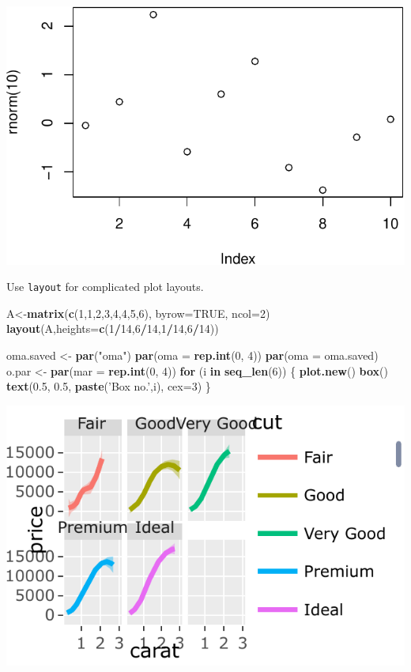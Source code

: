 \documentclass[]{book}
\newenvironment{Shaded}{\begin{snugshade}}{\end{snugshade}}
\newcommand{\KeywordTok}[1]{\textcolor[rgb]{0.13,0.29,0.53}{\textbf{#1}}}
\newcommand{\DataTypeTok}[1]{\textcolor[rgb]{0.13,0.29,0.53}{#1}}
\newcommand{\DecValTok}[1]{\textcolor[rgb]{0.00,0.00,0.81}{#1}}
\newcommand{\FloatTok}[1]{\textcolor[rgb]{0.00,0.00,0.81}{#1}}
\newcommand{\StringTok}[1]{\textcolor[rgb]{0.31,0.60,0.02}{#1}}
\newcommand{\OtherTok}[1]{\textcolor[rgb]{0.56,0.35,0.01}{#1}}
\newcommand{\ControlFlowTok}[1]{\textcolor[rgb]{0.13,0.29,0.53}{\textbf{#1}}}
\newcommand{\OperatorTok}[1]{\textcolor[rgb]{0.81,0.36,0.00}{\textbf{#1}}}
\newcommand{\NormalTok}[1]{#1}
\theoremstyle{definition}
\theoremstyle{definition}
\theoremstyle{definition}
\theoremstyle{remark}
\begin{document}
\includegraphics[width=0.5\linewidth]{Rcourse_files/figure-latex/unnamed-chunk-250-1}

Use \texttt{layout} for complicated plot layouts.

\begin{Shaded}
\begin{Highlighting}[]
\NormalTok{A<-}\KeywordTok{matrix}\NormalTok{(}\KeywordTok{c}\NormalTok{(}\DecValTok{1}\NormalTok{,}\DecValTok{1}\NormalTok{,}\DecValTok{2}\NormalTok{,}\DecValTok{3}\NormalTok{,}\DecValTok{4}\NormalTok{,}\DecValTok{4}\NormalTok{,}\DecValTok{5}\NormalTok{,}\DecValTok{6}\NormalTok{), }\DataTypeTok{byrow=}\OtherTok{TRUE}\NormalTok{, }\DataTypeTok{ncol=}\DecValTok{2}\NormalTok{)}
\KeywordTok{layout}\NormalTok{(A,}\DataTypeTok{heights=}\KeywordTok{c}\NormalTok{(}\DecValTok{1}\OperatorTok{/}\DecValTok{14}\NormalTok{,}\DecValTok{6}\OperatorTok{/}\DecValTok{14}\NormalTok{,}\DecValTok{1}\OperatorTok{/}\DecValTok{14}\NormalTok{,}\DecValTok{6}\OperatorTok{/}\DecValTok{14}\NormalTok{))}

\NormalTok{oma.saved <-}\StringTok{ }\KeywordTok{par}\NormalTok{(}\StringTok{"oma"}\NormalTok{)}
\KeywordTok{par}\NormalTok{(}\DataTypeTok{oma =} \KeywordTok{rep.int}\NormalTok{(}\DecValTok{0}\NormalTok{, }\DecValTok{4}\NormalTok{))}
\KeywordTok{par}\NormalTok{(}\DataTypeTok{oma =}\NormalTok{ oma.saved)}
\NormalTok{o.par <-}\StringTok{ }\KeywordTok{par}\NormalTok{(}\DataTypeTok{mar =} \KeywordTok{rep.int}\NormalTok{(}\DecValTok{0}\NormalTok{, }\DecValTok{4}\NormalTok{))}
\ControlFlowTok{for}\NormalTok{ (i }\ControlFlowTok{in} \KeywordTok{seq_len}\NormalTok{(}\DecValTok{6}\NormalTok{)) \{}
    \KeywordTok{plot.new}\NormalTok{()}
    \KeywordTok{box}\NormalTok{()}
    \KeywordTok{text}\NormalTok{(}\FloatTok{0.5}\NormalTok{, }\FloatTok{0.5}\NormalTok{, }\KeywordTok{paste}\NormalTok{(}\StringTok{'Box no.'}\NormalTok{,i), }\DataTypeTok{cex=}\DecValTok{3}\NormalTok{)}
\NormalTok{\}}
\end{Highlighting}
\end{Shaded}

\includegraphics[width=0.5\linewidth]{Rcourse_files/figure-latex/unnamed-chunk-251-1}
\end{document}
